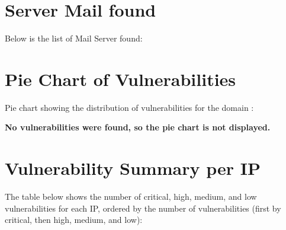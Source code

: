 \documentclass{article}
\begin{document}
{{{{{\clearpage

\section{Server Mail found}

Below is the list of Mail Server found:


\clearpage

\section{Pie Chart of Vulnerabilities}

\noindent Pie chart showing the distribution of vulnerabilities for the domain :

{%
\begin{figure}[H]
    \centering
\end{figure}
{%
\noindent \textbf{No vulnerabilities were found, so the pie chart is not displayed.}
{%

\clearpage

\section{Vulnerability Summary per IP}

\noindent The table below shows the number of critical, high, medium, and low vulnerabilities for each IP, ordered by the number of vulnerabilities (first by critical, then high, medium, and low):

}}}}}}}}
\end{document}
